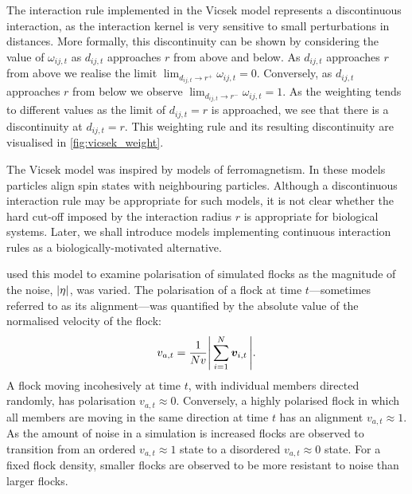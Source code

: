 The interaction rule implemented in the Vicsek model represents a discontinuous
interaction, as the interaction kernel is very sensitive to small perturbations
in distances. More formally, this discontinuity can be shown by considering the
value of $\omega_{ij, t}$ as $d_{ij,t}$ approaches $r$ from above and below. As
$d_{ij,t}$ approaches $r$ from above we realise the limit $\lim_{d_{ij,t}
\rightarrow r^+} \omega_{ij,t} = 0$. Conversely, as $d_{ij,t}$ approaches $r$
from below we observe $\lim_{d_{ij,t} \rightarrow r^-} \omega_{ij,t} = 1$. As
the weighting tends to different values as the limit of $d_{ij,t}=r$ is
approached, we see that there is a discontinuity at $d_{ij,t}=r$. This
weighting rule and its resulting discontinuity are visualised in
\cref{fig:vicsek_weight}.

The Vicsek model was inspired by models of ferromagnetism. In these models
particles align spin states with neighbouring particles. Although a
discontinuous interaction rule may be appropriate for such models, it is not
clear whether the hard cut-off imposed by the interaction radius $r$ is
appropriate for biological systems. Later, we shall introduce models
implementing continuous interaction rules as a biologically-motivated
alternative.

\textcite{vicsek95} used this model to examine polarisation of simulated flocks
as the magnitude of the noise, $\abs{\eta}$, was varied. The polarisation of a
flock at time $t$---sometimes referred to as its alignment---was quantified by
the absolute value of the normalised velocity of the flock:
\begin{equation}
  \label{eq:alignment}
  v_{a,t} = \frac{1}{Nv} \abs{\,\sum_{i=1}^N \bm{v}_{i,t}\,}.
\end{equation}
A flock moving incohesively at time $t$, with individual members directed
randomly, has polarisation $v_{a,t}\approx0$. Conversely, a highly polarised
flock in which all members are moving in the same direction at time $t$ has an
alignment $v_{a,t}\approx1$. As the amount of noise in a simulation is
increased flocks are observed to transition from an ordered $v_{a,t}\approx1$
state to a disordered $v_{a,t}\approx0$ state. For a fixed flock density,
smaller flocks are observed to be more resistant to noise than larger flocks.


